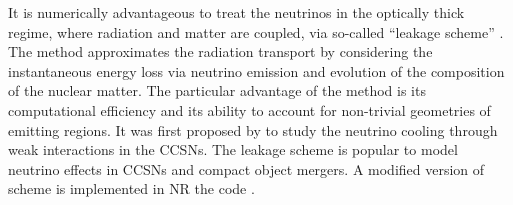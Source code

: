 It is numerically advantageous to treat the neutrinos in the optically thick regime, 
where radiation and matter are coupled, via 
so-called ``leakage scheme''
%
\citep{Ruffert:1995fs,Rosswog:2003rv,Sekiguchi:2010zz,OConnor:2009iuz,Galeazzi:2013mia}. 
%
%
The method approximates the radiation transport by considering 
the instantaneous energy loss via neutrino emission and evolution of the 
composition of the nuclear matter.
The particular advantage of the method is its computational efficiency and 
its ability to account for non-trivial geometries of emitting regions.
%
It was first proposed by \citet{vanRiper:1981mko} to study the neutrino cooling through 
weak interactions in the \acp{CCSN}. The leakage scheme is popular to model neutrino 
effects in \acp{CCSN} and compact object mergers.
%
A modified version of \citet{Galeazzi:2013mia} scheme is implemented in 
\ac{NR} the code \wisky{} \citep{Radice:2016dwd,Radice:2018pdn}.





